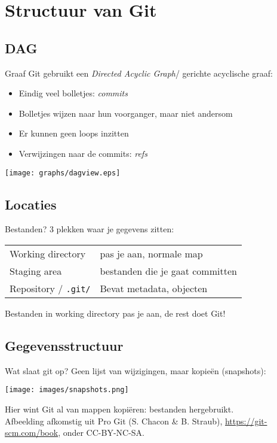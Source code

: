\section[Structuur]{Structuur van Git}
\subsection{DAG}
\begin{frame}{Graaf}
	Git gebruikt een \emph{Directed Acyclic Graph}/ gerichte acyclische graaf:
	\begin{itemize}
		\item Eindig veel bolletjes: \emph{commits}
		\item Bolletjes wijzen naar hun voorganger, maar niet andersom
		\item Er kunnen geen loops inzitten
		\item Verwijzingen naar de commits: \emph{refs}
	\end{itemize}

	\begin{center}
		\texttt{[image: graphs/dagview.eps]}
	\end{center}
\end{frame}

\subsection{Locaties}
\begin{frame}{Bestanden?}
	3 plekken waar je gegevens zitten:\\
	\vspace{.5cm}
	\begin{tabular}{ll}
		 Working directory			& pas je aan, normale map\\
		 Staging area				& bestanden die je gaat committen\\
		 Repository / \texttt{.git/}&Bevat metadata, objecten
	\end{tabular}

	Bestanden in working directory pas je aan, de rest doet Git!
\end{frame}

\subsection{Gegevensstructuur}
\begin{frame}{Wat slaat git op?}
	Geen lijst van wijzigingen, maar kopie\"en (snapshots):
	\begin{center}
		\texttt{[image: images/snapshots.png]}
	\end{center}
	{\footnotesize Hier wint Git al van mappen kopi\"eren: bestanden hergebruikt. } \\
	{\tiny Afbeelding afkomstig uit Pro Git (S. Chacon \& B. Straub), \url{https://git-scm.com/book}, onder CC-BY-NC-SA.}
\end{frame}

